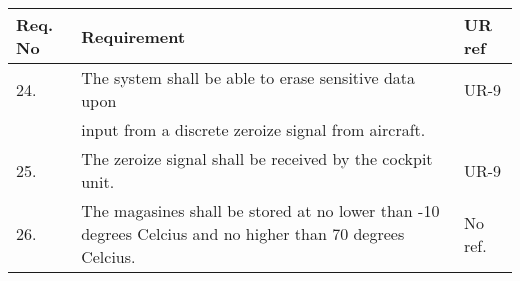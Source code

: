 \begin{center}
    \begin{tabular}{ | l | p{9cm} | l |}
    \hline 
    Req. No & Requirement  & UR ref \\ \hline
    24. & The system shall be able to erase sensitive data upon& UR-9\\& input from a discrete zeroize signal from aircraft.& \\ \hline
	25. & The zeroize signal shall be received by the cockpit unit.& UR-9 \\ \hline
	26. & The magasines shall be stored at no lower than -10 degrees Celcius and no higher than 70 degrees Celcius. & No ref.\\ \hline
    \end{tabular}
\end{center}